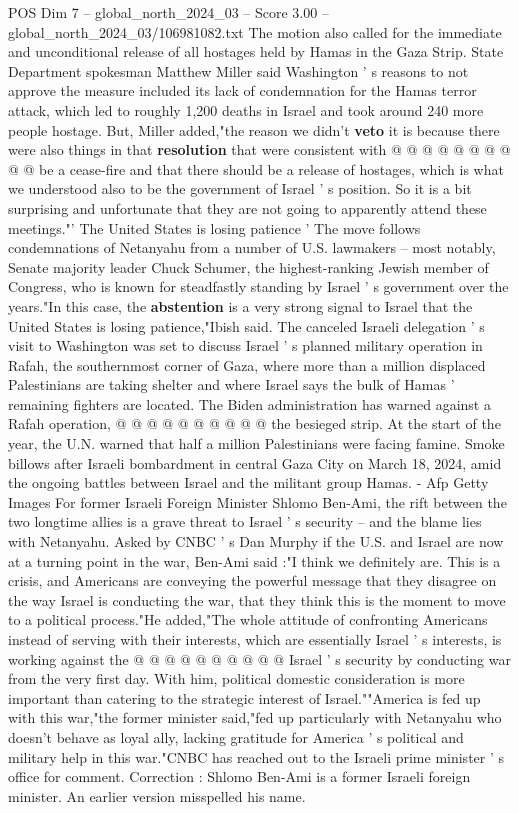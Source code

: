 \begin{textsample}{POS Dim 7 – global\_north\_2024\_03 – Score 3.00 – global\_north\_2024\_03/106981082.txt}
The motion also called for the immediate and unconditional release of all hostages held by Hamas in the Gaza Strip.
State Department spokesman Matthew Miller said Washington ' s reasons to not approve the measure included its lack of condemnation for the Hamas terror attack, which led to roughly 1,200 deaths in Israel and took around 240 more people hostage.
But, Miller added,"the reason we didn't \textbf{veto} it is because there were also things in that \textbf{resolution} that were consistent with @ @ @ @ @ @ @ @ @ @ be a cease-fire and that there should be a release of hostages, which is what we understood also to be the government of Israel ' s position.
So it is a bit surprising and unfortunate that they are not going to apparently attend these meetings."' The United States is losing patience ' The move follows condemnations of Netanyahu from a number of U.S. lawmakers -- most notably, Senate majority leader Chuck Schumer, the highest-ranking Jewish member of Congress, who is known for steadfastly standing by Israel ' s government over the years."In this case, the \textbf{abstention} is a very strong signal to Israel that the United States is losing patience,"Ibish said.
The canceled Israeli delegation ' s visit to Washington was set to discuss Israel ' s planned military operation in Rafah, the southernmost corner of Gaza, where more than a million displaced Palestinians are taking shelter and where Israel says the bulk of Hamas ' remaining fighters are located.
The Biden administration has warned against a Rafah operation, @ @ @ @ @ @ @ @ @ @ the besieged strip.
At the start of the year, the U.N. warned that half a million Palestinians were facing famine.
Smoke billows after Israeli bombardment in central Gaza City on March 18, 2024, amid the ongoing battles between Israel and the militant group Hamas. - Afp Getty Images For former Israeli Foreign Minister Shlomo Ben-Ami, the rift between the two longtime allies is a grave threat to Israel ' s security -- and the blame lies with Netanyahu.
Asked by CNBC ' s Dan Murphy if the U.S. and Israel are now at a turning point in the war, Ben-Ami said :"I think we definitely are.
This is a crisis, and Americans are conveying the powerful message that they disagree on the way Israel is conducting the war, that they think this is the moment to move to a political process."He added,"The whole attitude of confronting Americans instead of serving with their interests, which are essentially Israel ' s interests, is working against the @ @ @ @ @ @ @ @ @ @ Israel ' s security by conducting war from the very first day.
With him, political domestic consideration is more important than catering to the strategic interest of Israel.""America is fed up with this war,"the former minister said,"fed up particularly with Netanyahu who doesn't behave as loyal ally, lacking gratitude for America ' s political and military help in this war."CNBC has reached out to the Israeli prime minister ' s office for comment.
Correction : Shlomo Ben-Ami is a former Israeli foreign minister.
An earlier version misspelled his name.

\end{textsample}
